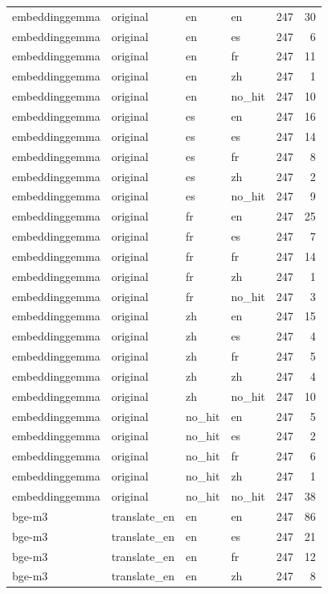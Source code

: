 \begin{tabular}{llllrr}
embeddinggemma & original & en & en & 247 & 30 \\
embeddinggemma & original & en & es & 247 & 6 \\
embeddinggemma & original & en & fr & 247 & 11 \\
embeddinggemma & original & en & zh & 247 & 1 \\
embeddinggemma & original & en & no\_hit & 247 & 10 \\
embeddinggemma & original & es & en & 247 & 16 \\
embeddinggemma & original & es & es & 247 & 14 \\
embeddinggemma & original & es & fr & 247 & 8 \\
embeddinggemma & original & es & zh & 247 & 2 \\
embeddinggemma & original & es & no\_hit & 247 & 9 \\
embeddinggemma & original & fr & en & 247 & 25 \\
embeddinggemma & original & fr & es & 247 & 7 \\
embeddinggemma & original & fr & fr & 247 & 14 \\
embeddinggemma & original & fr & zh & 247 & 1 \\
embeddinggemma & original & fr & no\_hit & 247 & 3 \\
embeddinggemma & original & zh & en & 247 & 15 \\
embeddinggemma & original & zh & es & 247 & 4 \\
embeddinggemma & original & zh & fr & 247 & 5 \\
embeddinggemma & original & zh & zh & 247 & 4 \\
embeddinggemma & original & zh & no\_hit & 247 & 10 \\
embeddinggemma & original & no\_hit & en & 247 & 5 \\
embeddinggemma & original & no\_hit & es & 247 & 2 \\
embeddinggemma & original & no\_hit & fr & 247 & 6 \\
embeddinggemma & original & no\_hit & zh & 247 & 1 \\
embeddinggemma & original & no\_hit & no\_hit & 247 & 38 \\
bge-m3 & translate\_en & en & en & 247 & 86 \\
bge-m3 & translate\_en & en & es & 247 & 21 \\
bge-m3 & translate\_en & en & fr & 247 & 12 \\
bge-m3 & translate\_en & en & zh & 247 & 8 \\

\end{tabular}
